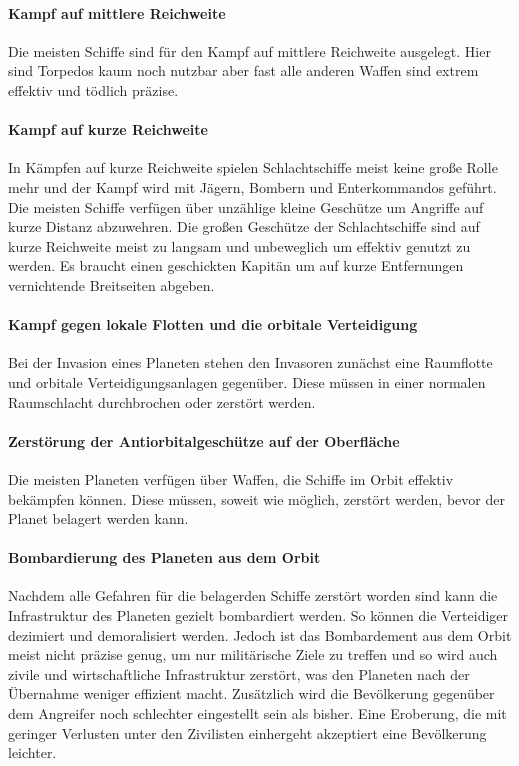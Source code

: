 \documentclass[11pt, a4paper]{article}
\begin{document}
\paragraph{Kampf auf mittlere Reichweite}
Die meisten Schiffe sind für den Kampf auf mittlere Reichweite ausgelegt. Hier sind Torpedos kaum noch nutzbar
aber fast alle anderen Waffen sind extrem effektiv und tödlich präzise.
%
\paragraph{Kampf auf kurze Reichweite}
In Kämpfen auf kurze Reichweite spielen Schlachtschiffe meist keine große Rolle mehr und der Kampf wird mit
Jägern, Bombern und Enterkommandos geführt. Die meisten Schiffe verfügen über unzählige kleine Geschütze 
um Angriffe auf kurze Distanz abzuwehren. Die großen Geschütze der Schlachtschiffe sind auf kurze Reichweite
meist zu langsam und unbeweglich um effektiv genutzt zu werden. Es braucht einen geschickten Kapitän um auf
kurze Entfernungen vernichtende Breitseiten abgeben.
%
\paragraph{Kampf gegen lokale Flotten und die orbitale Verteidigung}
Bei der Invasion eines Planeten stehen den Invasoren zunächst eine Raumflotte und orbitale 
Verteidigungsanlagen gegenüber. Diese müssen in einer normalen Raumschlacht durchbrochen oder zerstört werden.
%
\paragraph{Zerstörung der Antiorbitalgeschütze auf der Oberfläche}
Die meisten Planeten verfügen über Waffen, die Schiffe im Orbit effektiv bekämpfen können. Diese müssen, 
soweit wie möglich, zerstört werden, bevor der Planet belagert werden kann.
%
\paragraph{Bombardierung des Planeten aus dem Orbit}
Nachdem alle Gefahren für die belagerden Schiffe zerstört worden sind kann die Infrastruktur des Planeten 
gezielt bombardiert werden. So können die Verteidiger dezimiert und demoralisiert werden. Jedoch ist das 
Bombardement aus dem Orbit meist nicht präzise genug, um nur militärische Ziele zu treffen und so wird auch
zivile und wirtschaftliche Infrastruktur zerstört, was den Planeten nach der Übernahme weniger effizient 
macht. Zusätzlich wird die Bevölkerung gegenüber dem Angreifer noch schlechter eingestellt sein als bisher.
Eine Eroberung, die mit geringer Verlusten unter den Zivilisten einhergeht akzeptiert eine Bevölkerung 
leichter.
%
\end{document}
